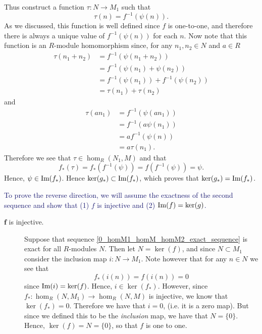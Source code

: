\begin{prf}
\begin{description}
            Thus construct a function $\tau: N \to M_1$ such that 
            \[
                \tau(n) = f^{-1}(\psi(n)).
            \]
            As we discussed, this function is well defined since
            $f$ is one-to-one, and therefore there is always a
            unique value of $f^{-1}(\psi(n))$ for each $n$. Now
            note that this function is an $R$-module homomorphism since, for
            any $n_1, n_2 \in N$ and $a \in R$  
            \begin{align*}
                \tau(n_1 + n_2) &=  f^{-1}(\psi(n_1 + n_2))\\
                &= f^{-1}(\psi(n_1) + \psi(n_2))\\
                &= f^{-1}(\psi(n_1)) + f^{-1}(\psi(n_2))\\
                &= \tau(n_1) + \tau(n_2)
            \end{align*}
            and 
            \begin{align*}
                \tau(an_1) &= f^{-1}(\psi(an_1))\\
                    &= f^{-1}(a\psi(n_1))\\
                    &= af^{-1}(\psi(n))\\
                    &= a\tau(n_1).
            \end{align*}
            Therefore we see that $\tau \in \hom_R(N_1, M)$ and that
            \[
                f_*(\tau) = f_*(f^{-1}(\psi)) = f(f^{-1}(\psi))= \psi.
            \]
            Hence, $\psi \in \mbox{Im}(f_*)$. Hence $\ker(g_*)
            \subset \mbox{Im}(f_*)$, which proves that $\ker(g_*) =
            \mbox{Im}(f_*)$.  
    \end{description}
    \textcolor{MidnightBlue}{To prove the reverse direction, we
    will assume the exactness of the second sequence and show that
    (1) $f$ is injective and (2) $\mbox{Im}(f) = \ker(g)$.}

    \begin{description}
        \item[$\bm{f}$ is injective.] Suppose that sequence
        \ref{0_homM1_homM_homM2_exact_sequence} is exact for all
        $R$-modules $N$. Then let $N = \ker(f)$, and since $N
        \subset M_1$ consider the
        inclusion map $i: N \to M_1.$  Note however that for any
        $n \in N$ we see that 
        \[
            f_*(i(n)) = f(i(n)) = 0
        \]
        since $\mbox{Im}(i) = \ker(f)$. Hence, $i \in \ker(f_*)$. 
        However, since $f_*: \hom_R(N,
        M_1) \to \hom_R(N, M)$ is injective, we know that
        $\ker(f_*) = 0$. Therefore we have that $i = 0$, (i.e. it
        is a zero map). But since we defined this to be the
        \textit{inclusion} map, we have that $N = \{0\}$. Hence,
        $\ker(f) = N = \{0\}$, so that $f$ is one to one.


\end{description}
\end{prf}
